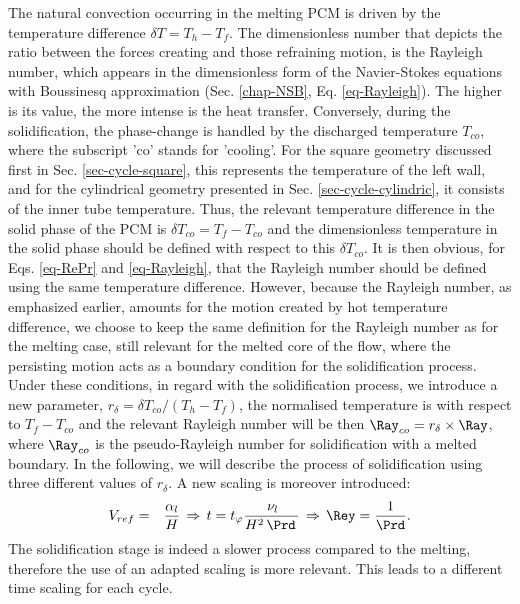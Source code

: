 The natural convection occurring in the melting PCM is driven by the temperature difference $\delta T = T_h - T_f$. 
The dimensionless number that depicts the ratio between the forces creating and those refraining motion, is the Rayleigh number, which appears in the dimensionless form of the Navier-Stokes equations with Boussinesq approximation (Sec. \ref{chap-NSB}, Eq. \ref{eq-Rayleigh}). 
The higher is its value, the more intense is the heat transfer.
Conversely, during the solidification, the phase-change is handled by the discharged temperature $T_{co}$, where the subscript 'co' stands for 'cooling'. 
For the square geometry discussed first in Sec. \ref{sec-cycle-square}, this represents the temperature of the left wall, 
and for the cylindrical geometry presented in Sec. \ref{sec-cycle-cylindric}, it consists of the inner tube temperature.
Thus, the relevant temperature difference in the solid phase of the PCM is $\delta T_{co} = T_f-T_{co}$ and the dimensionless temperature in the solid phase should be defined with respect to this $\delta T_{co}$. 
It is then obvious, for Eqs. \ref{eq-RePr} and \ref{eq-Rayleigh},  that the Rayleigh number should be defined using the same temperature difference.  
However, because the Rayleigh number, as emphasized earlier, amounts for the motion created by hot temperature difference, we choose to keep the same definition for the Rayleigh number as for the melting case, still relevant for the melted core of the flow, where the persisting motion acts as a boundary condition for the solidification process.    
Under these conditions, in regard with the solidification process, we introduce  a new parameter,  $r_{\delta} = \delta T_{co}/(T_h-T_f)$, the normalised temperature is with respect to 
$T_f-T_{co}$ and the relevant Rayleigh number will be then  $\Ray_{co}= r_{\delta} \times \Ray$, where $\Ray_{co}$ is the pseudo-Rayleigh number for solidification with a melted boundary. 
In the following, we will  describe  the process of solidification using three different values of $r_{\delta}$. 
A new scaling is moreover introduced: 
\begin{eqnarray}\label{ref-adimPCM2}
V_{ref}&=&\frac{\alpha_l}{H}  \, \Rightarrow  \, t = t_{\varphi} \frac{\, \nu_l }{ H^2 \, \Prd \,}\, \Rightarrow  \, \Rey  = \frac{1}{\Prd}.  \label{ref-adimdT} 
\end{eqnarray}
The solidification stage is indeed a slower process compared to the melting, therefore the use of an adapted scaling is more relevant.
This leads to a different time scaling for each cycle.

